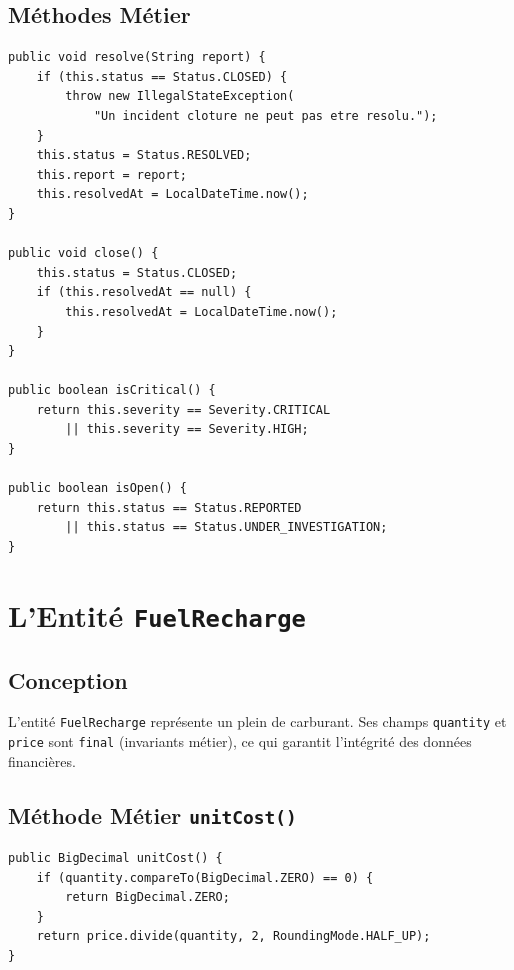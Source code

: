 \documentclass[12pt,a4paper]{report}
\begin{document}
\subsection{Méthodes Métier}

\begin{lstlisting}[style=javaStyle, caption={Méthodes métier de la machine à états Incident}]
public void resolve(String report) {
    if (this.status == Status.CLOSED) {
        throw new IllegalStateException(
            "Un incident cloture ne peut pas etre resolu.");
    }
    this.status = Status.RESOLVED;
    this.report = report;
    this.resolvedAt = LocalDateTime.now();
}

public void close() {
    this.status = Status.CLOSED;
    if (this.resolvedAt == null) {
        this.resolvedAt = LocalDateTime.now();
    }
}

public boolean isCritical() {
    return this.severity == Severity.CRITICAL
        || this.severity == Severity.HIGH;
}

public boolean isOpen() {
    return this.status == Status.REPORTED
        || this.status == Status.UNDER_INVESTIGATION;
}
\end{lstlisting}

\section{L'Entité \texttt{FuelRecharge}}

\subsection{Conception}

L'entité \texttt{FuelRecharge} représente un plein de carburant. Ses champs \texttt{quantity} et \texttt{price} sont \texttt{final} (invariants métier), ce qui garantit l'intégrité des données financières.

\subsection{Méthode Métier \texttt{unitCost()}}

\begin{lstlisting}[style=javaStyle, caption={Calcul du coût unitaire}]
public BigDecimal unitCost() {
    if (quantity.compareTo(BigDecimal.ZERO) == 0) {
        return BigDecimal.ZERO;
    }
    return price.divide(quantity, 2, RoundingMode.HALF_UP);
}
\end{lstlisting}
\end{document}
